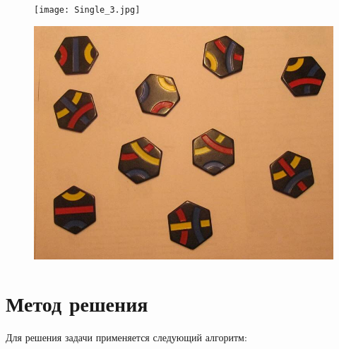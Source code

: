 \documentclass[a4paper, 12pt]{article}
\begin{document}
\begin{figure}[H]
\centering
\begin{minipage}{.5\textwidth}
  \centering
  \texttt{[image: Single\_3.jpg]}
  \label{fig:mpr_0}
  \vspace{0pt}
   \caption{}
\end{minipage}%
\begin{minipage}{.5\textwidth}
  \centering
   \includegraphics[width=0.9\linewidth]{Group_5.jpg}
   \label{fig:mpr_1}
   \vspace{0pt}
   \caption{}
\end{minipage}
\end{figure}


\section{Метод решения}  

Для решения задачи применяется следующий алгоритм: 
\end{document}
